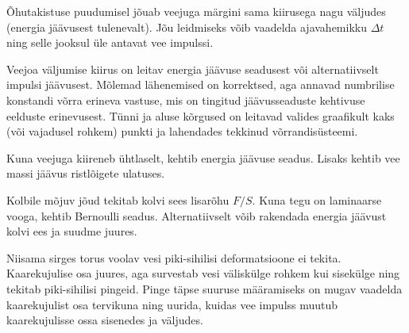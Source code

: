 \documentclass[10pt]{article}
\begin{document}
{%

\hint
Õhutakistuse puudumisel jõuab veejuga märgini sama kiirusega nagu väljudes (energia jäävusest tulenevalt). Jõu leidmiseks võib vaadelda ajavahemikku $\Delta t$ ning selle jooksul üle antavat vee impulssi.
\probend
\bigskip


\hint
Veejoa väljumise kiirus on leitav energia jäävuse seadusest või alternatiivselt impulsi jäävusest. Mõlemad lähenemised on korrektsed, aga annavad numbrilise konstandi võrra erineva vastuse, mis on tingitud jäävusseaduste kehtivuse eelduste erinevusest. Tünni ja aluse kõrgused on leitavad valides graafikult kaks (või vajadusel rohkem) punkti ja lahendades tekkinud võrrandisüsteemi.
\probend
\bigskip


\hint
Kuna veejuga kiireneb ühtlaselt, kehtib energia jäävuse seadus. Lisaks kehtib vee massi jäävus ristlõigete ulatuses.
\probend
\bigskip


\hint
Kolbile mõjuv jõud tekitab kolvi sees lisarõhu $F/S$. Kuna tegu on laminaarse vooga, kehtib Bernoulli seadus. Alternatiivselt võib rakendada energia jäävust kolvi ees ja suudme juures.
\probend
\bigskip


\hint
Niisama sirges torus voolav vesi piki-sihilisi deformatsioone ei tekita. Kaarekujulise osa juures, aga survestab vesi väliskülge rohkem kui sisekülge ning tekitab piki-sihilisi pingeid. Pinge täpse suuruse määramiseks on mugav vaadelda kaarekujulist osa tervikuna ning uurida, kuidas vee impulss muutub kaarekujulisse ossa sisenedes ja väljudes.
\probend
\bigskip


}
\end{document}
